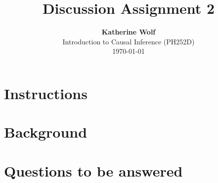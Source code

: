 \documentclass{article}\usepackage[]{graphicx}\usepackage[]{xcolor}
\title{\textbf{Discussion Assignment 2}}
\author{\textbf{Katherine Wolf}\\ Introduction to Causal Inference (PH252D)\\ \today}
\date{}
\begin{document}
\maketitle

\section{Instructions}

\section{Background}

\section{Questions to be answered}

\setlength{\leftskip}{0.8cm}
\end{document}

